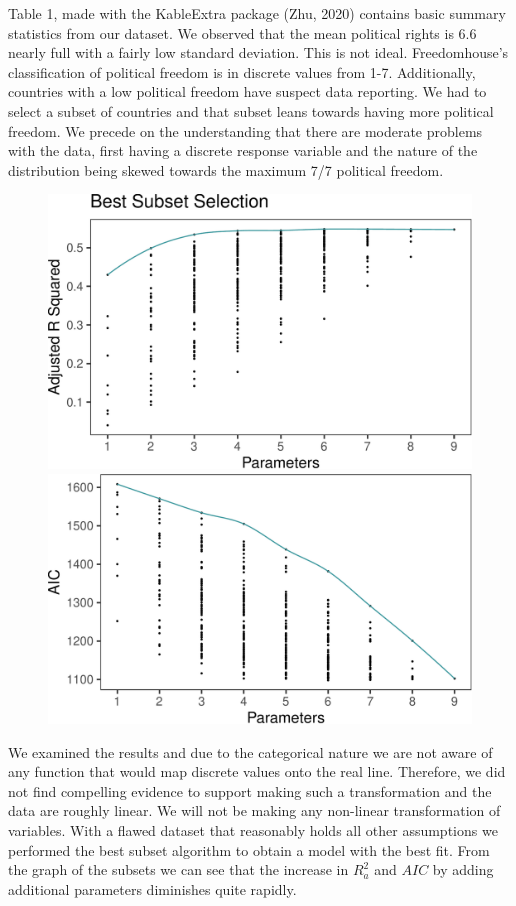 \documentclass[
  english,
  man,floatsintext]{apa6}
\begin{document}
Table 1, made with the KableExtra package (Zhu, 2020) contains basic summary statistics from our dataset. We observed that the mean political rights is 6.6 nearly full with a fairly low standard deviation. This is not ideal. Freedomhouse's classification of political freedom is in discrete values from 1-7. Additionally, countries with a low political freedom have suspect data reporting. We had to select a subset of countries and that subset leans towards having more political freedom. We precede on the understanding that there are moderate problems with the data, first having a discrete response variable and the nature of the distribution being skewed towards the maximum 7/7 political freedom.

\begin{figure}
\includegraphics[width=0.5\linewidth]{paper_files/figure-latex/unnamed-chunk-3-1} \includegraphics[width=0.5\linewidth]{paper_files/figure-latex/unnamed-chunk-3-2} \caption{ }\label{fig:unnamed-chunk-3}
\end{figure}

We examined the results and due to the categorical nature we are not aware of any function that would map discrete values onto the real line. Therefore, we did not find compelling evidence to support making such a transformation and the data are roughly linear. We will not be making any non-linear transformation of variables. With a flawed dataset that reasonably holds all other assumptions we performed the best subset algorithm to obtain a model with the best fit. From the graph of the subsets we can see that the increase in \(R^{2}_a\) and \(AIC\) by adding additional parameters diminishes quite rapidly.
\end{document}
